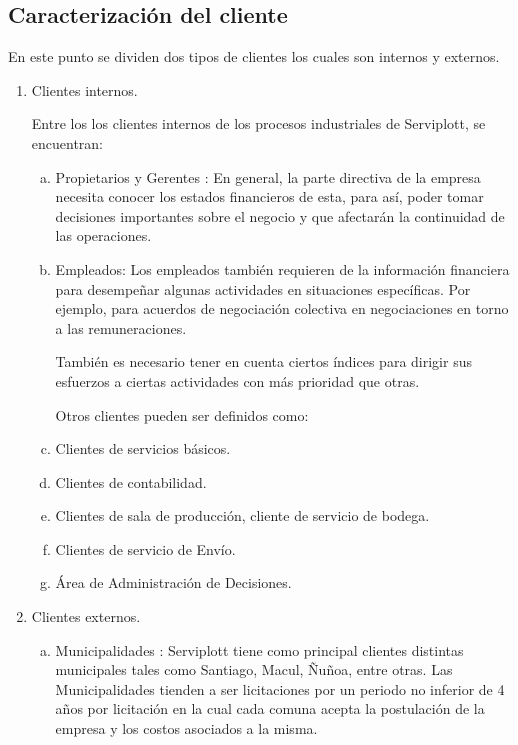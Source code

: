 	\subsection{Caracterización del cliente}
    	En este punto se dividen dos tipos de clientes los cuales son internos y externos.
	\begin{enumerate}[1)]
	\item Clientes internos. 
	
	Entre los los clientes internos de los procesos industriales de Serviplott, se encuentran:


	\begin{enumerate}[a)]
	\item Propietarios y Gerentes : En general, la parte directiva de la empresa necesita conocer los estados financieros de esta, para así, poder tomar decisiones importantes sobre el negocio y que afectarán la continuidad de las operaciones.
	\item Empleados: Los empleados también requieren de la información financiera para desempeñar algunas actividades en situaciones específicas. Por ejemplo, para acuerdos de negociación colectiva en negociaciones en torno a las remuneraciones.
	\vspace{5mm}
	
	También es necesario tener en cuenta ciertos índices para dirigir sus esfuerzos a ciertas actividades con más prioridad que otras.
\newpage
	
	Otros clientes pueden ser definidos como:
	\item Clientes de servicios básicos.
	\item Clientes de contabilidad.
	\item Clientes de sala de producción, cliente de servicio de bodega.
	\item Clientes de servicio de Envío.
	\item Área de Administración de Decisiones.
	

	\end{enumerate}
		
	\item Clientes externos.	
	\begin{enumerate}[a)]	
	\item Municipalidades : Serviplott tiene como principal clientes distintas municipales tales como Santiago, Macul, Ñuñoa, entre otras. Las Municipalidades tienden a ser licitaciones por un periodo no inferior de 4 años por licitación en la cual cada comuna acepta la postulación de la empresa y los costos asociados a la misma. 


\end{enumerate}
\end{enumerate}
